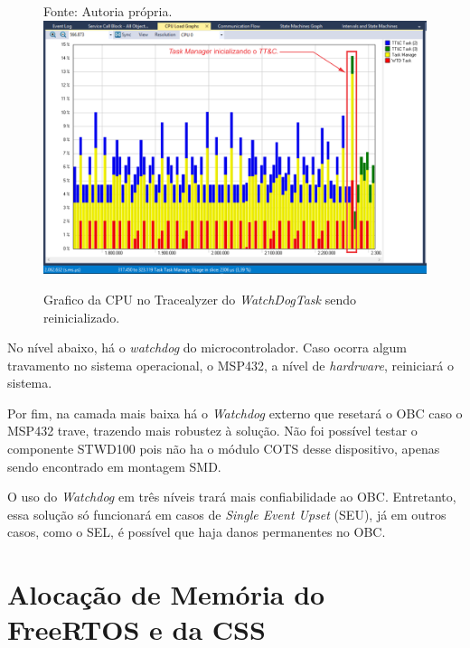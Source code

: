 \begin{figure}[h]
\footnotesize{	
	\centering
			\centering
	\footnotesize{Fonte: Autoria própria.}
	\includegraphics[keepaspectratio=true,scale=0.65]{figuras/watchDogFreeRTOS_description.PNG}
	\caption{Grafico da CPU no Tracealyzer do \textit{WatchDogTask} sendo reinicializado.}	
	\label{watchDogFreeRTOS}
}
\end{figure}


No nível abaixo, há o \textit{watchdog} do microcontrolador. Caso ocorra algum travamento no sistema operacional, o MSP432, a nível de \textit{hardrware}, reiniciará o sistema.

Por fim, na camada mais baixa há o \textit{Watchdog} externo que resetará o OBC caso o MSP432 trave, trazendo mais robustez à solução. Não foi possível testar o componente STWD100 pois não ha o módulo COTS desse dispositivo, apenas sendo encontrado em montagem SMD. 

O uso do \textit{Watchdog} em três níveis trará mais confiabilidade ao OBC. Entretanto, essa solução só funcionará em casos de \textit{Single Event Upset} (SEU), já em outros casos, como o SEL, é possível que haja danos permanentes no OBC. 

\section{Alocação de Memória do FreeRTOS e da CSS}


